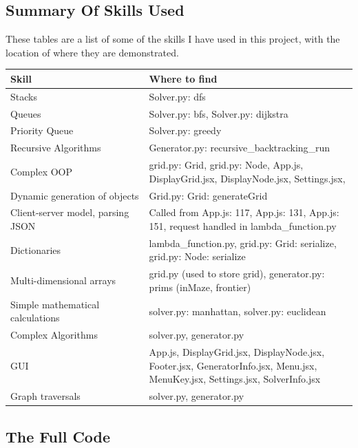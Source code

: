 \documentclass[titlepage]{article}
\begin{document}
\subsection{Summary Of Skills Used}
These tables are a list of some of the skills I have used in this project, with the location of where they are demonstrated.
\begin{center}
    \begin{tabular}{ |p{0.4\linewidth}|p{0.8\linewidth}| }
        \hline
        Skill & Where to find \\
        \hline
        \hline
        Stacks & Solver.py: dfs \\
        \hline
        Queues & Solver.py: bfs, Solver.py: dijkstra\\
        \hline
        Priority Queue & Solver.py: greedy \\
        \hline
        Recursive Algorithms & Generator.py: recursive\_backtracking\_run \\
        \hline
        Complex OOP & grid.py: Grid, grid.py: Node, App.js, DisplayGrid.jsx, DisplayNode.jsx, Settings.jsx,  \\
        \hline
        Dynamic generation of objects & Grid.py: Grid: generateGrid \\
        \hline
        Client-server model, parsing JSON & Called from App.js: 117, App.js: 131, App.js: 151, request handled in lambda\_function.py \\
        \hline
        Dictionaries & lambda\_function.py, grid.py: Grid: serialize, grid.py: Node: serialize \\
        \hline
        Multi-dimensional arrays & grid.py (used to store grid), generator.py: prims (inMaze, frontier) \\
        \hline 
        Simple mathematical calculations & solver.py: manhattan, solver.py: euclidean \\
        \hline
        Complex Algorithms & solver.py, generator.py \\
        \hline
        GUI & App.js, DisplayGrid.jsx, DisplayNode.jsx, Footer.jsx, GeneratorInfo.jsx, Menu.jsx, MenuKey.jsx, Settings.jsx, SolverInfo.jsx \\
        \hline
        Graph traversals & solver.py, generator.py \\
        \hline
    \end{tabular}
\end{center}

\subsection{The Full Code}
\end{document}
